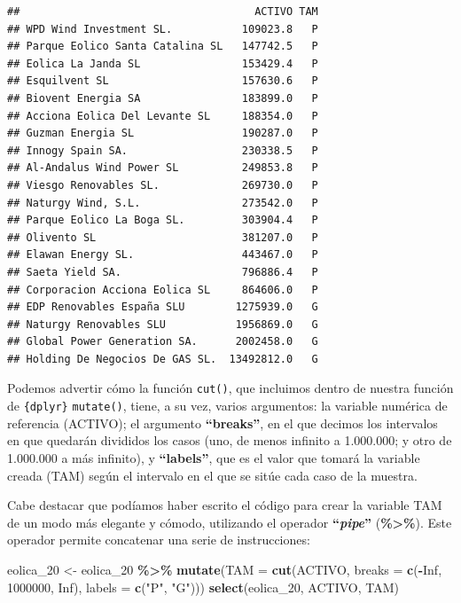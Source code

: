 \documentclass[
]{book}
\newenvironment{Shaded}{\begin{snugshade}}{\end{snugshade}}
\newcommand{\AttributeTok}[1]{\textcolor[rgb]{0.13,0.29,0.53}{#1}}
\newcommand{\ConstantTok}[1]{\textcolor[rgb]{0.56,0.35,0.01}{#1}}
\newcommand{\DecValTok}[1]{\textcolor[rgb]{0.00,0.00,0.81}{#1}}
\newcommand{\FunctionTok}[1]{\textcolor[rgb]{0.13,0.29,0.53}{\textbf{#1}}}
\newcommand{\NormalTok}[1]{#1}
\newcommand{\OtherTok}[1]{\textcolor[rgb]{0.56,0.35,0.01}{#1}}
\newcommand{\SpecialCharTok}[1]{\textcolor[rgb]{0.81,0.36,0.00}{\textbf{#1}}}
\newcommand{\StringTok}[1]{\textcolor[rgb]{0.31,0.60,0.02}{#1}}
\begin{document}
\begin{verbatim}
##                                     ACTIVO TAM
## WPD Wind Investment SL.           109023.8   P
## Parque Eolico Santa Catalina SL   147742.5   P
## Eolica La Janda SL                153429.4   P
## Esquilvent SL                     157630.6   P
## Biovent Energia SA                183899.0   P
## Acciona Eolica Del Levante SL     188354.0   P
## Guzman Energia SL                 190287.0   P
## Innogy Spain SA.                  230338.5   P
## Al-Andalus Wind Power SL          249853.8   P
## Viesgo Renovables SL.             269730.0   P
## Naturgy Wind, S.L.                273542.0   P
## Parque Eolico La Boga SL.         303904.4   P
## Olivento SL                       381207.0   P
## Elawan Energy SL.                 443467.0   P
## Saeta Yield SA.                   796886.4   P
## Corporacion Acciona Eolica SL     864606.0   P
## EDP Renovables España SLU        1275939.0   G
## Naturgy Renovables SLU           1956869.0   G
## Global Power Generation SA.      2002458.0   G
## Holding De Negocios De GAS SL.  13492812.0   G
\end{verbatim}

Podemos advertir cómo la función \texttt{cut()}, que incluimos dentro de nuestra función de \texttt{\{dplyr\}} \texttt{mutate()}, tiene, a su vez, varios argumentos: la variable numérica de referencia (ACTIVO); el argumento \textbf{``breaks''}, en el que decimos los intervalos en que quedarán divididos los casos (uno, de menos infinito a 1.000.000; y otro de 1.000.000 a más infinito), y \textbf{``labels''}, que es el valor que tomará la variable creada (TAM) según el intervalo en el que se sitúe cada caso de la muestra.

Cabe destacar que podíamos haber escrito el código para crear la variable TAM de un modo más elegante y cómodo, utilizando el operador \textbf{``\emph{pipe}''} (\textbf{\%\textgreater\%}). Este operador permite concatenar una serie de instrucciones:

\begin{Shaded}
\begin{Highlighting}[]
\NormalTok{eolica\_20 }\OtherTok{\textless{}{-}}\NormalTok{ eolica\_20 }\SpecialCharTok{\%\textgreater{}\%} \FunctionTok{mutate}\NormalTok{(}\AttributeTok{TAM =} \FunctionTok{cut}\NormalTok{(ACTIVO,}
  \AttributeTok{breaks =} \FunctionTok{c}\NormalTok{(}\SpecialCharTok{{-}}\ConstantTok{Inf}\NormalTok{, }\DecValTok{1000000}\NormalTok{, }\ConstantTok{Inf}\NormalTok{), }\AttributeTok{labels =} \FunctionTok{c}\NormalTok{(}\StringTok{"P"}\NormalTok{, }\StringTok{"G"}\NormalTok{)))}
\FunctionTok{select}\NormalTok{(eolica\_20, ACTIVO, TAM)}
\end{Highlighting}
\end{Shaded}
\end{document}
